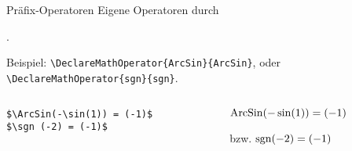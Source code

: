 \begin{frame}[fragile]{Präfix-Operatoren}
Eigene Operatoren durch
\begin{center}
.
\end{center}
Beispiel:  \verb+\DeclareMathOperator{ArcSin}{ArcSin}+, oder \verb+\DeclareMathOperator{sgn}{sgn}+\pause.
\begin{columns}
\begin{column}{0.55\textwidth}
\begin{codeblock}
\begin{verbatim}
$\ArcSin(-\sin(1)) = (-1)$ 
$\sgn (-2) = (-1)$
\end{verbatim}
\end{codeblock}
\end{column}
\begin{column}{0.4\textwidth}
${\operatorname{ArcSin}(-\sin(1)) = (-1)}$ 

bzw. $\operatorname{sgn} (-2) = (-1)$
\end{column}
\end{columns}
\end{frame}